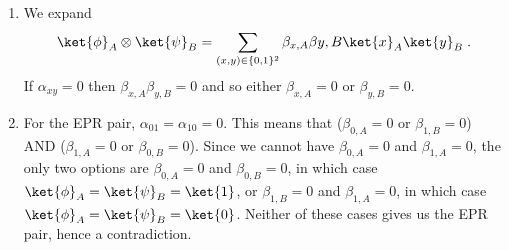 \begin{exercises}
\begin{enumerate}
\item We expand
\[ \ket{\phi}_A \otimes \ket{\psi}_B = \sum_{(x,y)\in\{0,1\}^2} \beta_{x,A}\beta{y,B}\ket{x}_A\ket{y}_B\;.\]
If $\alpha_{xy}=0$ then $\beta_{x,A}\beta_{y,B}=0$ and so either $\beta_{x,A}=0$ or $\beta_{y,B}=0$.
\item For the EPR pair, $\alpha_{01}=\alpha_{10}=0$. This means that ($\beta_{0,A}=0$ or $\beta_{1,B}=0$) AND ($\beta_{1,A}=0$ or $\beta_{0,B}=0$). Since we cannot have $\beta_{0,A}=0$ and $\beta_{1,A}=0$, the only two options are $\beta_{0,A}=0$ and $\beta_{0,B}=0$, in which case $\ket{\phi}_A = \ket{\psi}_B = \ket{1}$, or $\beta_{1,B}=0$ and $\beta_{1,A}=0$, in which case $\ket{\phi}_A = \ket{\psi}_B = \ket{0}$. Neither of these cases gives us the EPR pair, hence a contradiction. 
\end{enumerate}
\end{exercises}